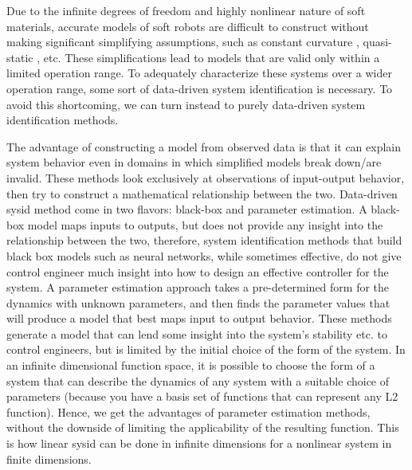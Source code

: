 Due to the infinite degrees of freedom and highly nonlinear nature of soft materials, accurate models of soft robots are difficult to construct without making significant simplifying assumptions, such as constant curvature \cite{something for each assumption listed}, quasi-static \cite{anything}, etc. These simplifications lead to models that are valid only within a limited operation range.
To adequately characterize these systems over a wider operation range, some sort of data-driven system identification is necessary.
To avoid this shortcoming, we can turn instead to purely data-driven system identification methods.

The advantage of constructing a model from observed data is that it can explain system behavior even in domains in which simplified models break down/are invalid. 
These methods look exclusively at observations of input-output behavior, then try to construct a mathematical relationship between the two. 
Data-driven sysid method come in two flavors: black-box and parameter estimation.
A black-box model maps inputs to outputs, but does not provide any insight into the relationship between the two, therefore, system identification methods that build black box models such as neural networks, while sometimes effective, do not give control engineer much insight into how to design an effective controller for the system.
A parameter estimation approach takes a pre-determined form for the dynamics with unknown parameters, and then finds the parameter values that will produce a model that best maps input to output behavior. These methods generate a model that can lend some insight into the system's stability etc. to control engineers, but is limited by the initial choice of the form of the system.
In an infinite dimensional function space, it is possible to choose the form of a system that can describe the dynamics of any system with a suitable choice of parameters (because you have a basis set of functions that can represent any L2 function). Hence, we get the advantages of parameter estimation methods, without the downside of limiting the applicability of the resulting function.
This is how linear sysid can be done in infinite dimensions for a nonlinear system in finite dimensions.


